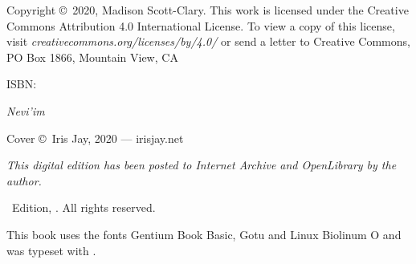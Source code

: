 {\small\parindent0pt\parskip5pt
\noindent Copyright \copyright\ 2020, Madison Scott-Clary. This work is licensed under the Creative Commons Attribution 4.0 International License. To view a copy of this license, visit \mbox{\emph{creativecommons.org/licenses/by/4.0/}} or send a letter to Creative Commons, PO Box 1866, Mountain View, CA

\vspace{1ex}

ISBN: \ISBN

\vspace{1ex}

\textit{Nevi'im}

\vspace{1ex}

Cover \copyright\ Iris Jay, 2020 --- irisjay.net

\vspace{1ex}

\textit{This digital edition has been posted to Internet Archive and OpenLibrary by the author.}

\Edition\ Edition, \Year. All rights reserved.

\vspace{1ex}

This book uses the fonts Gentium Book Basic, {\DisplayFont Gotu} and {\TitleFont Linux Biolinum O} and was typeset with {\XeLaTeX}.

}%

\clearpage
